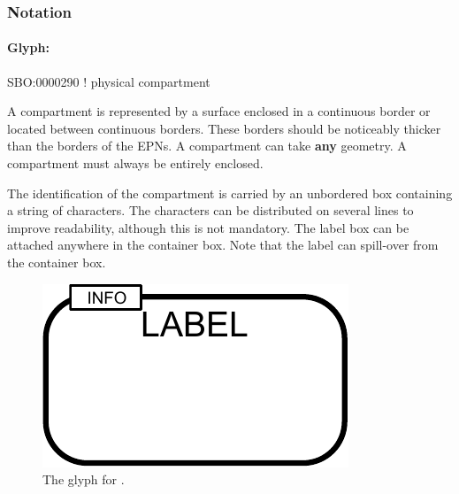 
\subsubsection{Notation}

\paragraph{Glyph: }\label{sec:techref:compartment}

\begin{glyphDescription}

\glyphSboTerm  SBO:0000290 ! physical compartment

\glyphContainer A compartment is represented by a surface enclosed in a continuous border or located between continuous borders. These borders should be noticeably thicker than the borders of the EPNs. A compartment can take \textbf{any} geometry. A compartment must always be entirely enclosed.

\glyphLabel The identification of the compartment is carried by an unbordered box containing a string of characters. The characters can be distributed on several lines to improve readability, although this is not mandatory. The label box can be attached anywhere in the container box. Note that the label can spill-over from the container box.

\end{glyphDescription}

\begin{figure}[htb]
  \centering
  \includegraphics[scale = 0.3]{images/compartment}
  \caption{The \PD glyph for .}
  \label{fig:techref:compartment}
\end{figure}


